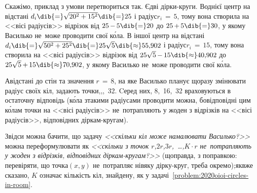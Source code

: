 Скажімо, приклад з умови перетвориться 
так.
Є\nolinebreak[3] дві дірки-круги. 
В\nolinebreak[3] однієї центр на відстані $d_i\dib{{=}}\sqrt{20^2+15^2}\dib{{=}}25$ і радіус\nolinebreak[2] ${r_i\,{=}\,5}$, тому вона створила на <<вісі радіусів>> відрізок 
від ${25\,{-}\,5}\dib{{=}}20$
до ${25\,{+}\,5}\dib{{=}}30$,
у якому Василько не~може проводити свої к\'{о}ла.
В іншої центр на відстані $d_i\dib{{=}}\sqrt{50^2+25^2}\dib{{=}}25\sqrt{5}\dib{{\approx}}55{,}902$ і радіус\nolinebreak[2] ${r_i\,{=}\,15}$, тому вона створила на <<вісі радіусів>> відрізок 
від ${25\sqrt{5}\,{-}\,15}\dib{{\approx}}40{,}902$
до ${25\sqrt{5}\,{+}\,15}\dib{{\approx}}70{,}902$,
у якому Василько не~може проводити свої к\'{о}ла. 

А\nolinebreak[3] відстані до стін та значення ${r\,{=}\,8}$, на яке Василько планує щоразу змінювати радіус своїх кіл, задають точки,,,~32. Cеред них, 8,~16,~32 враховуються в остаточну відповідь (к\'{о}ла з\nolinebreak[3] такими радіусами проводити можна, бо\nolinebreak[2] відповідні цим к\'{о}лам точки на <<вісі радіусів>> не~потрапляють у жоден з відрізків на <<вісі радіусів>>, відповідних діркам-кругам).

Звідси можна бачити, що задачу \textsl{<<скільки кіл може намалювати Василько?>>} можна переформулювати як 
\textsl{<<скільки з точок $r$,\nolinebreak[2] $2r$,\nolinebreak[2] $3r$,~\dots{},\nolinebreak[3] $K\cdot r$ не~потрапляють у жоден з відрізків, відповідних діркам-кругам?>>}
(щоправда, з поправкою: перевіряти, що точка\nolinebreak[2] $(x,y)$ не~потрапляє ні\nolinebreak[2] в\nolinebreak[2] яку дірку-круг, треба окремо);\linebreak[2] як\nolinebreak[3] вже сказано, $K$ означає кількість кіл, знайдену, як у задачі~\ref{problem:2020oioi-circles-in-room}.

\label{fig:202021-oioi-D-example-when-non-overlapping-disks-map-to-overlapping-segments}

